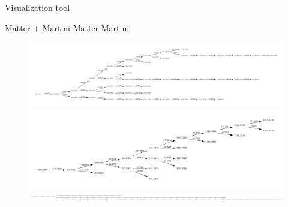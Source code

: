 \documentclass[11pt]{beamer}
\begin{document}
\begin{frame}{Visualization tool}

\begin{overprint}
 Matter + Martini
 Matter
 Martini
\end{overprint}

\begin{center}
\begin{figure}
\begin{overprint}
\includegraphics[width=1.8\textwidth]{./sample_jet_graph/graph-Matter-Martini/Jet_Matter_Martini.pdf}
\includegraphics[width=1.2\textwidth]{./sample_jet_graph/graph-Matter/Jet_Matter.pdf}
\includegraphics[width=6.\textwidth]{./sample_jet_graph/graph-Martini/Jet_Martini.pdf}
\end{overprint}
\end{figure}
\end{center}
\end{frame}
\end{document}
